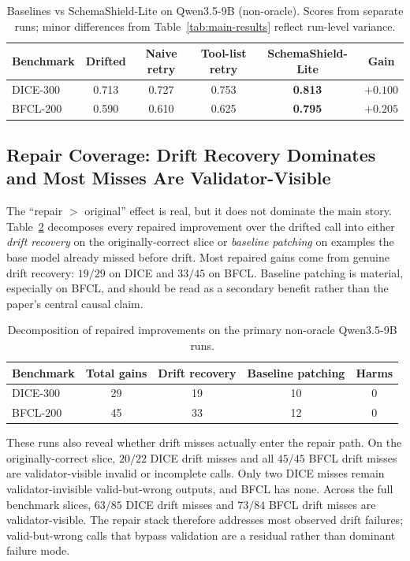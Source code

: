 \documentclass{llncs}
\newcommand{\method}{SchemaShield-Lite\xspace}
\begin{document}
\begin{table}[t]
\caption{Baselines vs \method on Qwen3.5-9B (non-oracle). Scores from separate
runs; minor differences from Table~\ref{tab:main-results} reflect run-level variance.}
\label{tab:naive-retry}
\centering
\small
\begin{tabular}{lccccc}
\toprule
Benchmark & Drifted & Naive retry & Tool-list retry & \method & Gain \\
\midrule
DICE-300   & 0.713 & 0.727 & 0.753 & \textbf{0.813} & $+0.100$ \\
BFCL-200   & 0.590 & 0.610 & 0.625 & \textbf{0.795} & $+0.205$ \\
\bottomrule
\end{tabular}
\end{table}

\subsection{Repair Coverage: Drift Recovery Dominates and Most Misses Are Validator-Visible}
\label{sec:repair-coverage}
The ``repair $>$ original'' effect is real, but it does not dominate the main
story. Table~\ref{tab:gain-decomposition} decomposes every repaired improvement over
the drifted call into either \emph{drift recovery} on the originally-correct slice
or \emph{baseline patching} on examples the base model already missed before drift.
Most repaired gains come from genuine drift recovery: $19/29$ on DICE and
$33/45$ on BFCL\@. Baseline patching is material, especially on BFCL, and should be
read as a secondary benefit rather than the paper's central causal claim.

\begin{table}[t]
\caption{Decomposition of repaired improvements on the primary non-oracle
Qwen3.5-9B runs.}
\label{tab:gain-decomposition}
\centering
\small
\begin{tabular}{lcccc}
\toprule
Benchmark & Total gains & Drift recovery & Baseline patching & Harms \\
\midrule
DICE-300 & 29 & 19 & 10 & 0 \\
BFCL-200 & 45 & 33 & 12 & 0 \\
\bottomrule
\end{tabular}
\end{table}

These runs also reveal whether drift misses actually enter the repair path.
On the originally-correct slice, $20/22$ DICE drift misses and all $45/45$ BFCL
drift misses are validator-visible invalid or incomplete calls. Only two DICE
misses remain validator-invisible valid-but-wrong outputs, and BFCL has none.
Across the full benchmark slices, $63/85$ DICE drift misses and $73/84$ BFCL
drift misses are validator-visible. The repair stack therefore addresses most
observed drift failures; valid-but-wrong calls that bypass validation are a
residual rather than dominant failure mode.
\end{document}
